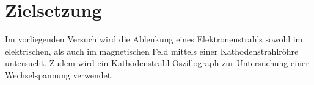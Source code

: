 \section{Zielsetzung}
\label{sec:Zielsetzung}
Im vorliegenden Versuch wird die Ablenkung eines Elektronenstrahls sowohl im elektrischen, als auch im magnetischen Feld mittels einer Kathodenstrahlröhre untersucht. Zudem wird ein Kathodenstrahl-Oszillograph zur Untersuchung einer Wechselspannung verwendet.
